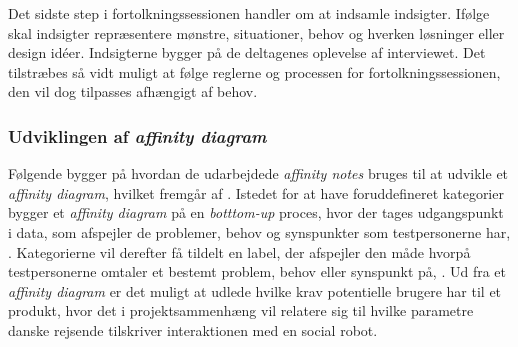 Det sidste step i fortolkningssessionen handler om at indsamle indsigter. Ifølge \textcite[s. 119]{Book:CIInterpretationSession} skal indsigter repræsentere mønstre, situationer, behov og hverken løsninger eller design idéer. Indsigterne bygger på de deltagenes oplevelse af interviewet. \blankline
%
Det tilstræbes så vidt muligt at følge reglerne og processen for fortolkningssessionen, den vil dog tilpasses afhængigt af behov. 

\subsubsection{Udviklingen af \textit{affinity diagram}}
\label{ParametreUdviklingAfAffinity}
% 
Følgende bygger på hvordan de udarbejdede \textit{affinity notes} bruges til at udvikle et \textit{affinity diagram}, hvilket fremgår af \textcite[ss. 159-179]{Book:BuildingAnAffinity}. Istedet for at have foruddefineret kategorier bygger et \textit{affinity diagram} på en \textit{botttom-up} proces, hvor der tages udgangspunkt i data, som afspejler de problemer, behov og synspunkter som testpersonerne har, \parencite[s. 159]{Book:BuildingAnAffinity}. Kategorierne vil derefter få tildelt en label, der afspejler den måde hvorpå testpersonerne omtaler et bestemt problem, behov eller synspunkt på, \parencite[s. 159]{Book:BuildingAnAffinity}. Ud fra et \textit{affinity diagram} er det muligt at udlede hvilke krav potentielle brugere har til et produkt, hvor det i projektsammenhæng vil relatere sig til hvilke parametre danske rejsende tilskriver interaktionen med en social robot. 

